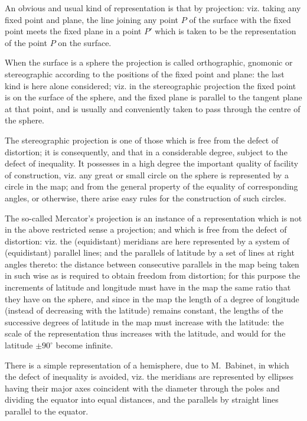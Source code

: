 \documentclass[11pt,a4paper]{article}
\begin{document}
An obvious and usual kind of representation is that by projection: viz. taking any fixed point and plane, the line joining any point $P$ of the surface with the fixed point meets the fixed plane in a point $P'$ which is taken to be the representation of the point $P$ on the surface.

When the surface is a sphere the projection is called orthographic, gnomonic or stereographic according to the positions of the fixed point and plane: the last kind is here alone considered; viz. in the stereographic projection the fixed point is on the surface of the sphere, and the fixed plane is parallel to the tangent plane at that point, and is usually and conveniently taken to pass through the centre of the sphere.

The stereographic projection is one of those which is free from the defect of distortion; it is consequently, and that in a considerable degree, subject to the defect of inequality.
It possesses in a high degree the important quality of facility of construction, viz. any great or small circle on the sphere is represented by a circle in the map; and from the general property of the equality of corresponding angles, or otherwise, there arise easy rules for the construction of such circles.

The so-called Mercator's projection is an instance of a representation which is not in the above restricted sense a projection; and which is free from the defect of distortion: viz. the (equidistant) meridians are here represented by a system of (equidistant) parallel lines; and the parallels of latitude by a set of lines at right angles thereto: the distance between consecutive parallels in the map being taken in such wise as is required to obtain freedom from distortion; for this purpose the increments of latitude and longitude must have in the map the same ratio that they have on the sphere, and since in the map the length of a degree of longitude (instead of decreasing with the latitude) remains constant, the lengths of the successive degrees of latitude in the map must increase with the latitude: the scale of the representation thus increases with the latitude, and would for the latitude $\pm90^\circ$ become infinite.

There is a simple representation of a hemisphere, due to M.~Babinet, in which the defect of inequality is avoided, viz. the meridians are represented by ellipses having their major axes coincident with the diameter through the poles and dividing the equator into equal distances, and the parallels by straight lines parallel to the equator.
\end{document}
